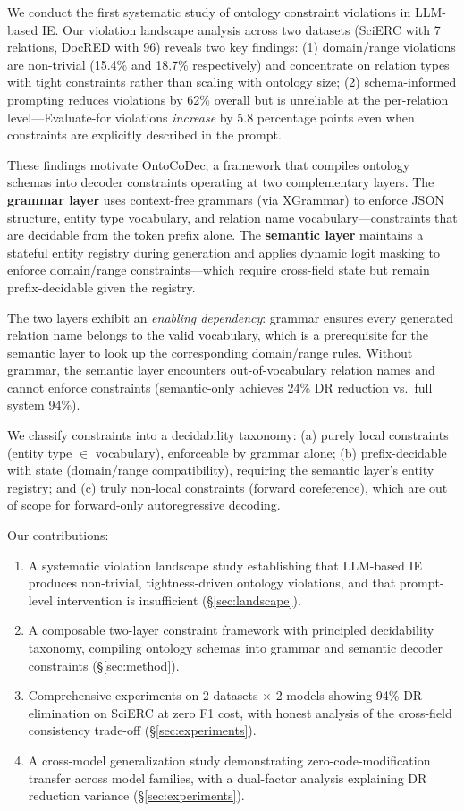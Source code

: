 \documentclass[11pt,a4paper]{article}
\newcommand{\sys}{OntoCoDec}
\begin{document}
We conduct the first systematic study of ontology constraint violations in LLM-based IE. Our violation landscape analysis across two datasets (SciERC with 7 relations, DocRED with 96) reveals two key findings: (1) domain/range violations are non-trivial (15.4\% and 18.7\% respectively) and concentrate on relation types with tight constraints rather than scaling with ontology size; (2) schema-informed prompting reduces violations by 62\% overall but is unreliable at the per-relation level---Evaluate-for violations \emph{increase} by 5.8 percentage points even when constraints are explicitly described in the prompt.

These findings motivate \sys{}, a framework that compiles ontology schemas into decoder constraints operating at two complementary layers. The \textbf{grammar layer} uses context-free grammars (via XGrammar) to enforce JSON structure, entity type vocabulary, and relation name vocabulary---constraints that are decidable from the token prefix alone. The \textbf{semantic layer} maintains a stateful entity registry during generation and applies dynamic logit masking to enforce domain/range constraints---which require cross-field state but remain prefix-decidable given the registry.

The two layers exhibit an \emph{enabling dependency}: grammar ensures every generated relation name belongs to the valid vocabulary, which is a prerequisite for the semantic layer to look up the corresponding domain/range rules. Without grammar, the semantic layer encounters out-of-vocabulary relation names and cannot enforce constraints (semantic-only achieves 24\% DR reduction vs.\ full system 94\%).

We classify constraints into a decidability taxonomy: (a) purely local constraints (entity type $\in$ vocabulary), enforceable by grammar alone; (b) prefix-decidable with state (domain/range compatibility), requiring the semantic layer's entity registry; and (c) truly non-local constraints (forward coreference), which are out of scope for forward-only autoregressive decoding.

Our contributions:
\begin{enumerate}
\item A systematic violation landscape study establishing that LLM-based IE produces non-trivial, tightness-driven ontology violations, and that prompt-level intervention is insufficient (\S\ref{sec:landscape}).
\item A composable two-layer constraint framework with principled decidability taxonomy, compiling ontology schemas into grammar and semantic decoder constraints (\S\ref{sec:method}).
\item Comprehensive experiments on 2 datasets $\times$ 2 models showing 94\% DR elimination on SciERC at zero F1 cost, with honest analysis of the cross-field consistency trade-off (\S\ref{sec:experiments}).
\item A cross-model generalization study demonstrating zero-code-modification transfer across model families, with a dual-factor analysis explaining DR reduction variance (\S\ref{sec:experiments}).
\end{enumerate}
\end{document}
